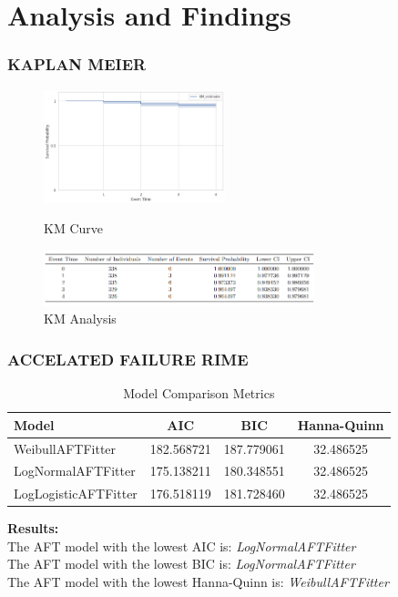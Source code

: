 \documentclass{beamer}
\begin{document}
	\section{Analysis and Findings}
	\begin{frame}
		\frametitle{KAPLAN  MEIER}
		\begin{figure}[H]
			\centering
			\includegraphics[width=0.47\textwidth]{Figure 4/4.1.png}
			\hfill
			\caption{KM Curve}
			\label{Table 1}
			\includegraphics[width=0.7\textwidth]{Presentation/ana.png}
			
			\caption{KM Analysis}
			\label{Figure 1}
		\end{figure}
	\end{frame}
	\begin{frame}
 		\frametitle{ACCELATED FAILURE RIME}
        
\begin{table}[H]
    \centering
    \begin{tabular}{lccc}
        \toprule
        Model & AIC & BIC & Hanna-Quinn \\
        \midrule
        WeibullAFTFitter & 182.568721 & 187.779061 & 32.486525 \\
        LogNormalAFTFitter & 175.138211 & 180.348551 & 32.486525 \\
        LogLogisticAFTFitter & 176.518119 & 181.728460 & 32.486525 \\
        \bottomrule
    \end{tabular}
    \caption{Model Comparison Metrics}
    \label{tab:model_comparison}
\end{table}

\noindent
\textbf{Results:} \\
The AFT model with the lowest AIC is: \textit{LogNormalAFTFitter} \\
The AFT model with the lowest BIC is: \textit{LogNormalAFTFitter} \\
The AFT model with the lowest Hanna-Quinn is: \textit{WeibullAFTFitter}

    \end{frame}
	
\end{document}
